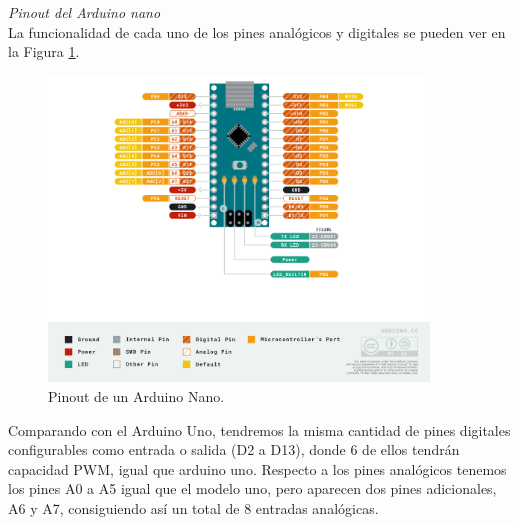\documentclass[12pt]{article}
\begin{document}
	\noindent \textit{Pinout del Arduino nano} \\
	
	\noindent La funcionalidad de cada uno de los pines analógicos y digitales se pueden ver en la Figura \ref{Pinout Arduino nano}. \\
	
	\begin{figure}[h!]
		\begin{center}
			\includegraphics[width=0.9\textwidth]{img/Pinout-NANO_official.png}
			\caption{Pinout de un Arduino Nano.}
			\label{Pinout Arduino nano}
		\end{center}
	\end{figure}

	\pagebreak
	
	\noindent Comparando con el Arduino Uno, tendremos la misma cantidad de pines digitales configurables como entrada o salida (D2 a D13), donde 6 de ellos tendrán capacidad PWM, igual que arduino uno. Respecto a los pines analógicos tenemos los pines A0 a A5 igual que el modelo uno, pero aparecen dos pines adicionales, A6 y A7, consiguiendo así un total de 8 entradas analógicas. \\
	
	
\end{document}
